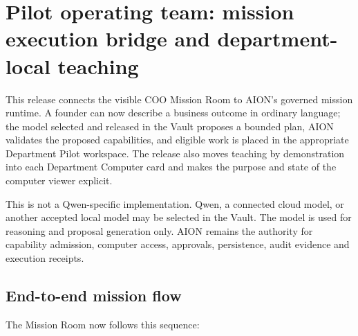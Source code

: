 
\section*{Pilot operating team: mission execution bridge and department-local teaching}

This release connects the visible COO Mission Room to AION's governed mission
runtime. A founder can now describe a business outcome in ordinary language;
the model selected and released in the Vault proposes a bounded plan, AION
validates the proposed capabilities, and eligible work is placed in the
appropriate Department Pilot workspace. The release also moves teaching by
demonstration into each Department Computer card and makes the purpose and
state of the computer viewer explicit.

This is not a Qwen-specific implementation. Qwen, a connected cloud model, or
another accepted local model may be selected in the Vault. The model is used
for reasoning and proposal generation only. AION remains the authority for
capability admission, computer access, approvals, persistence, audit evidence
and execution receipts.

\subsection*{End-to-end mission flow}

The Mission Room now follows this sequence:

